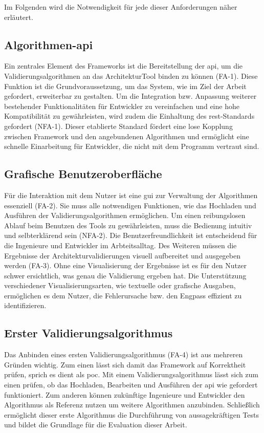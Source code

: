 Im Folgenden wird die Notwendigkeit für jede dieser Anforderungen näher erläutert.

\subsection*{Algorithmen-\gls{api}}

Ein zentrales Element des Frameworks ist die Bereitstellung der \gls{api}, um die Validierungsalgorithmen an das ArchitekturTool binden zu können (FA-1). Diese Funktion ist die Grundvoraussetzung, um das System, wie im Ziel der Arbeit gefordert, erweiterbar zu gestalten. Um die Integration bzw. Anpassung weiterer bestehender Funktionalitäten für Entwickler zu vereinfachen und eine hohe Kompatibilität zu gewährleisten, wird zudem die Einhaltung des \gls{rest}-Standards gefordert (NFA-1). Dieser etablierte Standard fördert eine lose Kopplung zwischen Framework und den angebundenen Algorithmen und ermöglicht eine schnelle Einarbeitung für Entwickler, die nicht mit dem Programm vertraut sind.

\subsection*{Grafische Benutzeroberfläche}

Für die Interaktion mit dem Nutzer ist eine \gls{gui} zur Verwaltung der Algorithmen essenziell (FA-2). Sie muss alle notwendigen Funktionen, wie das Hochladen und Ausführen der Validierungsalgorithmen ermöglichen. Um einen reibungslosen Ablauf beim Benutzen des Tools zu gewährleisten, muss die Bedienung intuitiv und selbterklärend sein (NFA-2). Die Benutzerfreundlichkeit ist entscheidend für die Ingenieure und Entwickler im Arbteitsalltag. Des Weiteren müssen die Ergebnisse der Architekturvalidierungen visuell aufbereitet und ausgegeben werden (FA-3). Ohne eine Visualisierung der Ergebnisse ist es für den Nutzer schwer ersichtlich, was genau die Validierung ergeben hat. Die Unterstützung verschiedener Visualisierungsarten, wie textuelle oder grafische Ausgaben, ermöglichen es dem Nutzer, die Fehlerursache bzw. den Engpass effizient zu identifizieren.

\subsection*{Erster Validierungsalgorithmus}

Das Anbinden eines ersten Validierungsalgorithmus (FA-4) ist aus mehreren Gründen wichtig. Zum einen lässt sich damit das Framework auf Korrektheit prüfen, sprich es dient als \gls{poc}. Mit einem Validierungsalgorithmus lässt sich zum einen prüfen, ob das Hochladen, Bearbeiten und Ausführen der \gls{api} wie gefordert funktioniert. Zum anderen können  zukünftige Ingenieure und Entwickler den Algorithmus als Referenz nutzen um weitere Algorithmen anzubinden. Schließlich ermöglicht dieser erste Algorithmus die Durchführung von aussagekräftigen Tests und bildet die Grundlage für die Evaluation dieser Arbeit.


